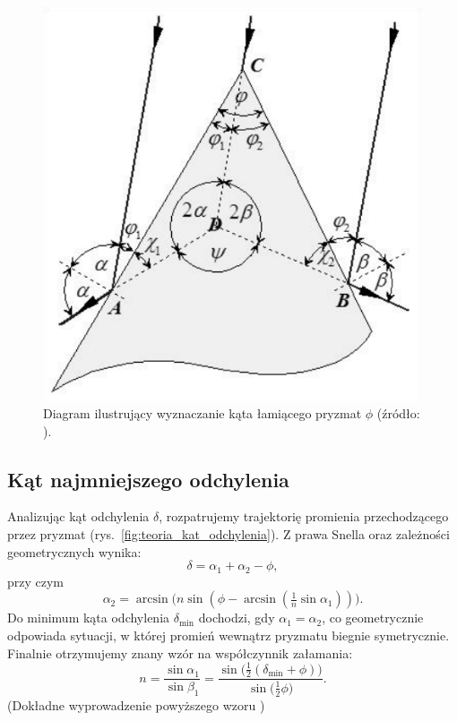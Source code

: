 \documentclass[12pt]{article}
\begin{document}
\begin{figure}[H]
    \centering
    \includegraphics[scale=0.5]{teoria_kat_pryzmatu}
    \caption{Diagram ilustrujący wyznaczanie kąta łamiącego pryzmat $\phi$ (źródło: \cite{cwiczenie}).}
    \label{fig:teoria_kat_lamiacy}
\end{figure}

\subsection{Kąt najmniejszego odchylenia}
Analizując kąt odchylenia $\delta$, rozpatrujemy trajektorię promienia przechodzącego przez pryzmat (rys.~\ref{fig:teoria_kat_odchylenia}). Z prawa Snella oraz zależności geometrycznych wynika:  
\[
    \delta = \alpha_{1} + \alpha_{2} - \phi,
\]
przy czym
\[
    \alpha_{2} = \arcsin\bigl(n \sin(\phi - \arcsin(\tfrac{1}{n}\sin \alpha_1))\bigr).
\]
Do minimum kąta odchylenia $\delta_{\mathrm{min}}$ dochodzi, gdy $\alpha_{1} = \alpha_{2}$, co geometrycznie odpowiada sytuacji, w której promień wewnątrz pryzmatu biegnie symetrycznie. Finalnie otrzymujemy znany wzór na współczynnik załamania:
\begin{equation}
    n = \frac{\sin \alpha_{1}}{\sin \beta_{1}} 
    = \frac{\sin\bigl(\tfrac{1}{2}(\delta_{\mathrm{min}} + \phi)\bigr)}{\sin\bigl(\tfrac{1}{2}\phi\bigr)}.
    \label{eq:index}
\end{equation}
(Dokładne wyprowadzenie powyższego wzoru \cite{optics})
\end{document}
